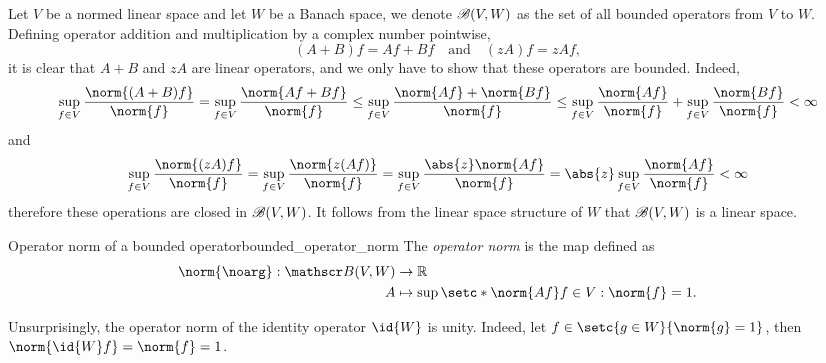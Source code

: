Let \(V\) be a normed linear space and let \(W\) be a Banach space, we denote \(\mathscr{B}(V,W)\) as the set of all bounded operators from \(V\) to \(W\). Defining operator addition and multiplication by a complex number pointwise,
\begin{equation*}
    (A + B)f = Af + Bf\quad\text{and}\quad (zA)f = zAf,
\end{equation*}
it is clear that \(A+B\) and \(zA\) are linear operators, and we only have to show that these operators are bounded. Indeed,
\begin{equation*}
    \sup_{f \in V} \frac{\norm{(A+B)f}}{\norm{f}} = \sup_{f\in V} \frac{\norm{Af + Bf}}{\norm{f}} \leq \sup_{f \in V} \frac{\norm{Af} + \norm{Bf}}{\norm{f}} \leq \sup_{f\in V} \frac{\norm{Af}}{\norm{f}} + \sup_{f\in V} \frac{\norm{Bf}}{\norm{f}} < \infty
\end{equation*}
and
\begin{align*}
    \sup_{f \in V} \frac{\norm{(zA)f}}{\norm{f}} = \sup_{f \in V} \frac{\norm{z(Af)}}{\norm{f}} = \sup_{f \in V} \frac{\abs{z}\norm{Af}}{\norm{f}} = \abs{z} \sup_{f \in V} \frac{\norm{Af}}{\norm{f}} < \infty
\end{align*}
therefore these operations are closed in \(\mathscr{B}(V, W)\). It follows from the linear space structure of \(W\) that \(\mathscr{B}(V, W)\) is a linear space.
\begin{definition}{Operator norm of a bounded operator}{bounded_operator_norm}
    The \emph{operator norm} is the map defined as
    \begin{align*}
        \norm{\noarg} : \bounded(V, W) &\to \mathbb{R}\\
        A &\mapsto \sup{\setc*{\norm{Af}}{f \in V : \norm{f} = 1}}.
    \end{align*}
\end{definition}
\begin{remark}
    Unsurprisingly, the operator norm of the identity operator \(\id{W}\) is unity. Indeed, let \(f \in \setc{g \in W}{\norm{g} = 1}\), then \(\norm{\id{W}f} = \norm{f} = 1\).
\end{remark}


